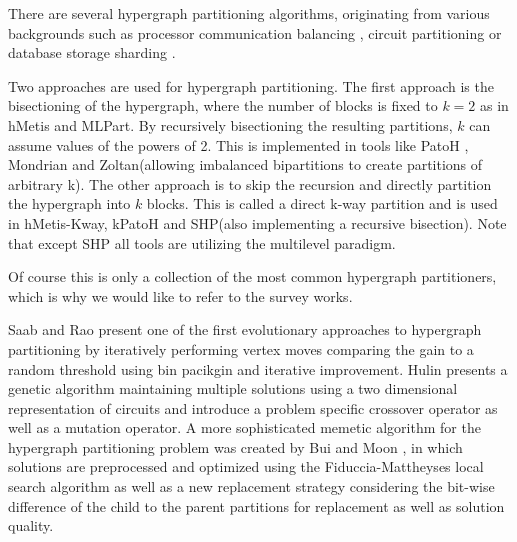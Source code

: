 \documentclass[a4paper,12pt,titlepage, BCOR7mm,headsepline]{scrbook}
\numberwithin{equation}{section}
\begin{document}
There are several hypergraph partitioning algorithms, originating from various backgrounds such as processor communication balancing \cite{catalyurek1999hypergraph}, circuit partitioning \cite{alpert1998multilevel} or database storage sharding \cite{kabiljo2017social}.

Two approaches are used for hypergraph partitioning. The first approach is the bisectioning of the hypergraph, where the number of blocks is fixed to $k=2$ as in hMetis\cite{karypis1999multilevel} and MLPart\cite{alpert1998multilevel}. By recursively bisectioning the resulting partitions, $k$ can assume values of the powers of 2. This is implemented in tools like PatoH \cite{catalyurek1999hypergraph}, Mondrian\cite{vastenhouw2005two} and Zoltan\cite{devine2006parallel}(allowing imbalanced bipartitions to create partitions of arbitrary k). The other approach is to skip the recursion and directly partition the hypergraph into $k$ blocks. This is called a direct k-way partition and is used in hMetis-Kway\cite{karypis2000multilevel}, kPatoH \cite{aykanat2008multi} and SHP\cite{kabiljo2017social}(also implementing a recursive bisection). Note that except SHP \cite{kabiljo2017social} all tools are utilizing the multilevel paradigm. 

Of course this is only a collection of the most common hypergraph partitioners, which is why we would like to refer to the survey works\cite{alpert1995recent}\cite{bader2013graph}\cite{papa2007hypergraph}\cite{trifunovic2006parallel}.





Saab and Rao \cite{saab1989evolution} present one of the first evolutionary approaches to hypergraph partitioning by iteratively performing vertex moves comparing the gain to a random threshold using bin pacikgin and iterative improvement. Hulin \cite{hulin1990circuit} presents a genetic algorithm maintaining multiple solutions using a two dimensional representation of circuits and introduce a problem specific crossover operator as well as a mutation operator. A more sophisticated memetic algorithm for the hypergraph partitioning problem was created by Bui and Moon \cite{bui1994fast}, in which solutions are preprocessed and optimized using the Fiduccia-Mattheyses \cite{fiduccia1988linear} local search algorithm as well as a new replacement strategy considering the bit-wise difference of the child to the parent partitions for replacement as well as solution quality. 
\end{document}
